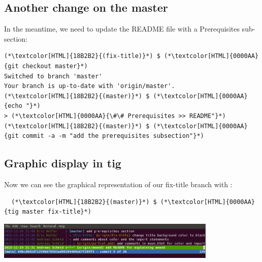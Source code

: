 \subsection{Another change on the master}
\begin{frame}[fragile]
  \subslidetitle

  In the meantime, we need to update the README file with a Prerequisites sub-section:
  \begin{lstlisting}
(*\textcolor[HTML]{18B2B2}{(fix-title)}*) $ (*\textcolor[HTML]{0000AA}{git checkout master}*)
Switched to branch 'master'
Your branch is up-to-date with 'origin/master'.
(*\textcolor[HTML]{18B2B2}{(master)}*) $ (*\textcolor[HTML]{0000AA}{echo "}*)
> (*\textcolor[HTML]{0000AA}{\#\# Prerequisites >> README"}*)
(*\textcolor[HTML]{18B2B2}{(master)}*) $ (*\textcolor[HTML]{0000AA}{git commit -a -m "add the prerequisites subsection"}*)
\end{lstlisting}

\end{frame}


\subsection{Graphic display in tig}
\begin{frame}[fragile]
  \subslidetitle

  Now we can see the graphical representation of our fix-title branch with :
  \begin{lstlisting}
  (*\textcolor[HTML]{18B2B2}{(master)}*) $ (*\textcolor[HTML]{0000AA}{tig master fix-title}*)
\end{lstlisting}

  \vspace{1em}

  \centerline{\includegraphics[width=10.5cm]{../screen/tig-fix-title.png}}

\end{frame}

